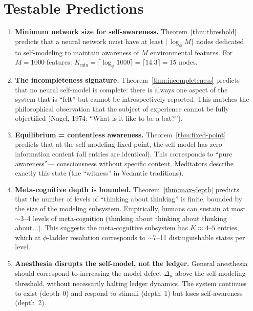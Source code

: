 \documentclass[11pt,a4paper]{article}
\theoremstyle{plain}
\theoremstyle{definition}
\theoremstyle{remark}
\begin{document}
\section{Testable Predictions}
\label{sec:predictions}

\begin{enumerate}[nosep]
\item \textbf{Minimum network size for self-awareness.}
  Theorem~\ref{thm:threshold} predicts that a neural network must have
  at least $\lceil\log_\phi M\rceil$ nodes dedicated to self-modeling
  to maintain awareness of $M$ environmental features.  For
  $M = 1000$ features: $K_{\min} = \lceil\log_\phi 1000\rceil
  = \lceil 14.3\rceil = 15$ nodes.

\item \textbf{The incompleteness signature.}
  Theorem~\ref{thm:incompleteness} predicts that no neural self-model
  is complete: there is always one aspect of the system that is ``felt''
  but cannot be introspectively reported.  This matches the
  philosophical observation that the subject of experience cannot be
  fully objectified (Nagel, 1974: ``What is it like to be a bat?'').

\item \textbf{Equilibrium = contentless awareness.}
  Theorem~\ref{thm:fixed-point} predicts that at the self-modeling
  fixed point, the self-model has zero information content (all entries
  are identical).  This corresponds to ``pure awareness''---
  consciousness without specific content.  Meditators describe exactly
  this state (the ``witness'' in Vedantic traditions).

\item \textbf{Meta-cognitive depth is bounded.}
  Theorem~\ref{thm:max-depth} predicts that the number of levels of
  ``thinking about thinking'' is finite, bounded by the size of the
  modeling subsystem.  Empirically, humans can sustain at most $\sim$3--4
  levels of meta-cognition (thinking about thinking about thinking
  about...).  This suggests the meta-cognitive subsystem has
  $K \approx 4$--$5$ entries, which at $\phi$-ladder resolution
  corresponds to $\sim$7--11 distinguishable states per level.

\item \textbf{Anesthesia disrupts the self-model, not the ledger.}
  General anesthesia should correspond to increasing the model defect
  $\Delta_\mu$ above the self-modeling threshold, without necessarily
  halting ledger dynamics.  The system continues to exist (depth~0) and
  respond to stimuli (depth~1) but loses self-awareness (depth~2).
\end{enumerate}
\end{document}

